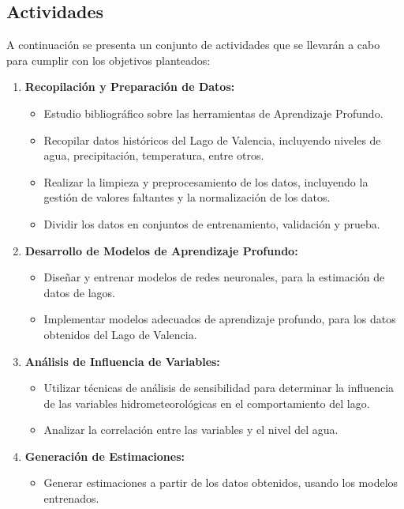 \documentclass[12pt]{article}
\begin{document}
\subsection{Actividades}
A continuaci\'on se presenta un conjunto de actividades que se llevarán a cabo para cumplir con los objetivos planteados:
\begin{enumerate}
    \item \textbf{Recopilación y Preparación de Datos:}
    \begin{itemize}
        \item Estudio bibliogr\'afico sobre las herramientas de Aprendizaje Profundo.
        \item Recopilar datos históricos del Lago de Valencia, incluyendo niveles de agua, precipitación, temperatura, entre otros.
        \item Realizar la limpieza y preprocesamiento de los datos, incluyendo la gestión de valores faltantes y la normalización de los datos.
        \item Dividir los datos en conjuntos de entrenamiento, validación y prueba.
    \end{itemize}
    \item \textbf{Desarrollo de Modelos de Aprendizaje Profundo:}
    \begin{itemize}
        \item Diseñar y entrenar modelos de redes neuronales, para la estimación de datos de lagos.        
        \item Implementar modelos adecuados de aprendizaje profundo, para los datos obtenidos del Lago de Valencia.
    \end{itemize}
    \item \textbf{Análisis de Influencia de Variables:}
    \begin{itemize}
        \item Utilizar técnicas de análisis de sensibilidad para determinar la influencia de las variables hidrometeorológicas en el comportamiento del lago.
        \item Analizar la correlación entre las variables y el nivel del agua.
    \end{itemize}
    \item \textbf{Generación de Estimaciones:}
    \begin{itemize}
        \item Generar estimaciones a partir de los datos obtenidos, usando los modelos entrenados.
    \end{itemize}
\end{enumerate}
\end{document}
